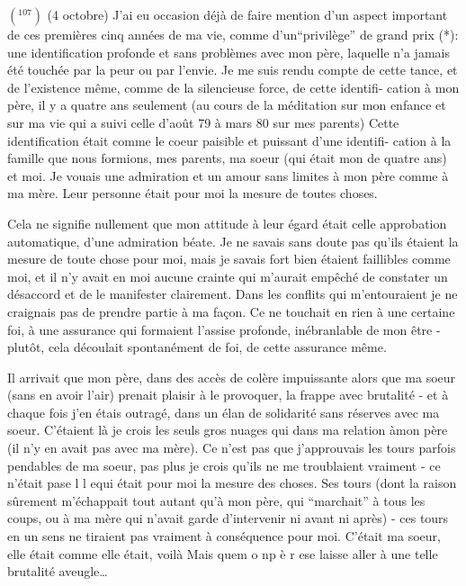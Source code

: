 $({}^{107})$ (4 octobre) J'ai eu occasion déjà de faire mention d'un aspect important
de ces premières cinq années de ma vie, comme d'un``privilège'' de grand prix (*):
une identification profonde et sans problèmes avec mon père, laquelle n'a jamais
été touchée par la peur ou par l'envie. Je me suis rendu compte de cette \newline
tance, et de l'existence même, comme de la silencieuse force, de cette identifi-\newline
cation à mon père, il y a quatre ans seulement (au cours de la méditation sur
mon enfance et sur ma vie qui a suivi celle d'août 79 à mars 80 sur mes parents)
Cette identification était comme le coeur paisible et puissant d'une identifi-\newline
cation à la famille que nous formions, mes parents, ma soeur (qui était mon 
de quatre ans) et moi. Je vouais une admiration et un amour sans limites à mon
père comme à ma mère. Leur personne était pour moi la mesure de toutes choses.

Cela ne signifie nullement que mon attitude à leur égard était celle 
approbation automatique, d'une admiration béate. Je ne savais sans doute pas
qu'ils étaient la mesure de toute chose pour moi, mais je savais fort bien 
étaient faillibles comme moi, et il n'y avait en moi aucune crainte qui m'aurait
empêché de constater un désaccord et de le manifester clairement. Dans les
conflits qui m'entouraient\unsure{;|,} je ne craignais pas de prendre partie à ma façon. Ce
ne touchait en rien à une certaine foi, à une assurance qui formaient l'assise
profonde, inébranlable de mon être - plutôt, cela découlait spontanément de 
foi, de cette assurance même.

Il arrivait que mon père, dans des accès de colère impuissante alors que
ma soeur (sans en avoir l'air) prenait plaisir à le provoquer, la frappe avec
brutalité - et à chaque fois j'en étais outragé, dans un élan de solidarité sans
réserves avec ma soeur. C'étaient là je crois les seuls gros nuages qui 
dans ma relation à\unsure{:}mon père (il n'y en avait pas avec ma mère). Ce n'est pas que
j'approuvais les tours parfois pendables de ma soeur, pas plus je crois qu'ils
ne me troublaient vraiment - ce n'était pas\quad e l l e\quad qui était pour moi la
mesure des choses. Ses tours (dont la raison sûrement m'échappait tout autant
qu'à mon père, qui ``marchait'' à tous les coups, ou à ma mère qui n'avait garde
d'intervenir ni avant ni après) - ces tours en un sens ne tiraient pas vraiment
à conséquence pour moi. C'était ma soeur, elle était comme elle était, voilà 
Mais que\quad m o n\quad p è r e\quad se laisse aller à une telle brutalité aveugle\ldots

